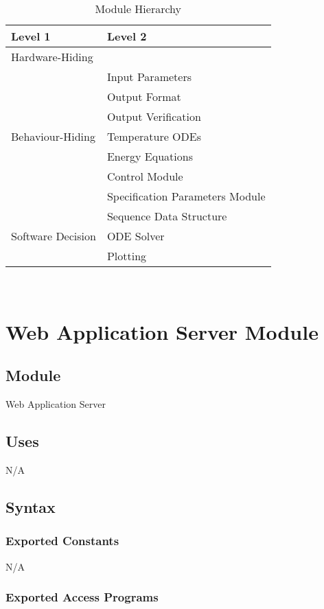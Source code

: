 \documentclass[12pt, titlepage]{article}
\begin{document}
\begin{table}[h!]
\centering
\begin{tabular}{p{} p{}}
\toprule
\textbf{Level 1} & \textbf{Level 2}\\
\midrule

{Hardware-Hiding} & ~ \\
\midrule

\multirow{7}{0.3\textwidth}{Behaviour-Hiding} & Input Parameters\\
& Output Format\\
& Output Verification\\
& Temperature ODEs\\
& Energy Equations\\ 
& Control Module\\
& Specification Parameters Module\\
\midrule

\multirow{3}{0.3\textwidth}{Software Decision} & {Sequence Data Structure}\\
& ODE Solver\\
& Plotting\\
\bottomrule

\end{tabular}
\caption{Module Hierarchy}
\label{TblMH}
\end{table}

\newpage
~\newpage
\section{Web Application Server Module} 

\subsection{Module}
Web Application Server   
\subsection{Uses}
N/A
\subsection{Syntax}
\subsubsection{Exported Constants}
N/A
\subsubsection{Exported Access Programs}
\end{document}

